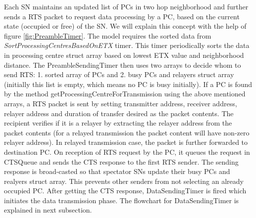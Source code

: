 	Each \ac{SN} maintains an updated list of \acp{PC} in two hop neighborhood and further sends a \ac{RTS} packet to request data processing by a \ac{PC}, based on the current state (occupied or free) of the \ac{SN}. We will explain this concept with the help of figure \ref{fig:PreambleTimer}. The model requires the sorted data from \textit{SortProcessingCentresBasedOnETX} timer. This timer periodically sorts the data in processing centre struct array based on lowest \ac{ETX} value and neighborhood distance. The PreambleSendingTimer then uses two arrays to decide whom to send \ac{RTS}: 1. sorted array of \acp{PC} and 2. busy \acp{PC} and relayers struct array (initially this list is empty, which means no \ac{PC} is busy initially). If a \ac{PC} is found by the method getProcessingCentreForTransmission using the above mentioned arrays, a \ac{RTS} packet is sent by setting transmitter address, receiver address, relayer address and duration of transfer desired as the packet contents. The recipient verifies if it is a relayer by extracting the relayer address from the packet contents (for a relayed transmission the packet content will have non-zero relayer address). In relayed transmission case, the packet is further forwarded to destination \ac{PC}. On reception of \ac{RTS} request by the \ac{PC}, it queues the request in CTSQueue and sends the \ac{CTS} response to the first \ac{RTS} sender. The sending response is broad-casted so that spectator \acp{SN} update their busy \acp{PC} and realyers struct array. This prevents other senders from not selecting an already occupied \ac{PC}. After getting the \ac{CTS} response, DataSendingTimer is fired which initiates the data transmission phase. The flowchart for DataSendingTimer is explained in next subsection.
	
